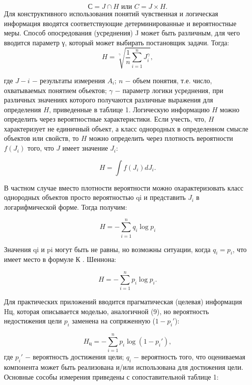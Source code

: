 \documentclass[a4paper,12pt]{report}
\begin{document}
	\begin{equation}
\label{trivial}
 С = J \cap  H \mbox{ или } C = J \times H.		
\end{equation}						
	Для конструктивного использования понятий чувственная и логическая информация вводятся соответствующие детерминированные и вероятностные меры. Способ опосредования (усреднения) J может быть различным, для чего вводится параметр γ, который может выбирать постановщик задачи. Тогда:
	\begin{equation}
\label{trivial}
 H = \sqrt[ \gamma ]{ \frac{1}{n} \sum_{i = 1}^n J_i^\gamma}  , 
\end{equation}										 

где $J-i$ − результаты измерения $A_i$; $n$ − объем понятия, т.е. число, охватываемых понятием объектов; $\gamma$ − параметр логики усреднения, при различных значениях которого получаются различные выражения для определения $H$, приведенные в таблице 1.
	Логическую информацию $H$ можно определить через вероятностные характеристики. Если учесть, что, $H$ характеризует не единичный объект, а класс однородных в определенном смысле объектов или свойств, то $H$ можно определить через плотность вероятности $f(J_i)$ того, что $J$ имеет значение $J_i$:

	\begin{equation}
\label{trivial}
H = \int f( J_i)dJ_i  .
\end{equation} 										

	В частном случае вместо плотности вероятности можно охарактеризовать класс однородных объектов просто вероятностью qi и представить $J_i$ в логарифмической форме. Тогда получим:

	\begin{equation}
\label{trivial}
H =  -\sum_{i = 1}^{n}q_i \log p_i
\end{equation} 

Значения qi и pi могут быть не равны, но возможны ситуации, когда $q_i = p_i$, что имеет место в формуле К . Шеннона:

	\begin{equation}
\label{trivial}
H =  -\sum_{i = 1}^{n}p_i \log p_i.
\end{equation} 									      

	Для практических приложений вводится прагматическая (целевая) информация Hц, которая описывается моделью, аналогичной (9), но вероятность недостижения цели $p_i$ заменена на сопряженную ($1 - p_i'$):

	\begin{equation}
\label{trivial}
H_ц = - \sum_{i=1}^{ n} p_i \log (1 - p_i'),
\end{equation} 
где $p_i'$ − вероятность достижения цели; $q_i$ − вероятность того, что оцениваемая компонента может быть реализована и/или использована для достижения цели.
Основные сособы измерения приведены с сопоставительной таблице 1:\\
\end{document}
